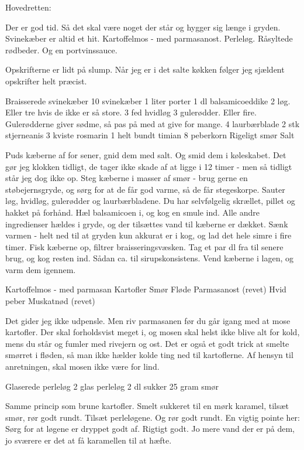 \documentclass[
]{book}
\begin{document}
Hovedretten:

Der er god tid. Så det skal være noget der står og hygger sig længe i gryden. Svinekæber er altid et hit. Kartoffelmos - med parmasanost. Perleløg. Råsyltede rødbeder. Og en portvinssauce.

Opskrifterne er lidt på slump. Når jeg er i det salte køkken følger jeg sjældent opskrifter helt præcist.

Braisserede svinekæber
10 svinekæber
1 liter porter
1 dl balsamicoeddike
2 løg. Eller tre hvis de ikke er så store.
3 fed hvidløg
3 gulerødder. Eller fire. Gulerødderne giver sødme, så pas på med at give for mange.
4 laurbærblade
2 stk stjerneanis
3 kviste rosmarin
1 helt bundt timian
8 peberkorn
Rigeligt smør
Salt

Puds kæberne af for sener, gnid dem med salt. Og smid dem i køleskabet. Det gør jeg klokken tidligt, de tager ikke skade af at ligge i 12 timer - men så tidligt står jeg dog ikke op.
Steg kæberne i masser af smør - brug gerne en støbejernsgryde, og sørg for at de får god varme, så de får stegeskorpe.
Sauter løg, hvidløg, gulerødder og laurbærbladene. Du har selvfølgelig skrællet, pillet og hakket på forhånd. Hæl balsamicoen i, og kog en smule ind.
Alle andre ingredienser hældes i gryde, og der tilsættes vand til kæberne er dækket. Sænk varmen - helt ned til at gryden kun akkurat er i kog, og lad det hele simre i fire timer.
Fisk kæberne op, filtrer braisseringsvæsken. Tag et par dl fra til senere brug, og kog resten ind. Sådan ca. til sirupskonsistens. Vend kæberne i lagen, og varm dem igennem.

Kartoffelmos - med parmasan
Kartofler
Smør
Fløde
Parmasanost (revet)
Hvid peber
Muskatnød (revet)

Det gider jeg ikke udpensle. Men riv parmasanen før du går igang med at mose kartofler. Der skal forholdsvist meget i, og mosen skal helst ikke blive alt for kold, mens du står og fumler med rivejern og ost. Det er også et godt trick at smelte smørret i fløden, så man ikke hælder kolde ting ned til kartoflerne. Af hensyn til anretningen, skal mosen ikke være for lind.

Glaserede perleløg
2 glas perleløg
2 dl sukker
25 gram smør

Samme princip som brune kartofler. Smelt sukkeret til en mørk karamel, tilsæt smør, rør godt rundt. Tilsæt perleløgene. Og rør godt rundt. En vigtig pointe her: Sørg for at løgene er dryppet godt af. Rigtigt godt. Jo mere vand der er på dem, jo sværere er det at få karamellen til at hæfte.
\end{document}

